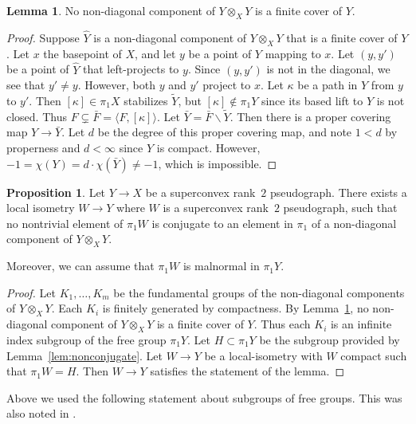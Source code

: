 \documentclass[12pt,oneside]{amsart}
\theoremstyle{definition}
\newtheorem{lem}[thm]{Lemma}
\newtheorem{prop}[thm]{Proposition}
\theoremstyle{definition}
\theoremstyle{remark}
\newcommand{\euler}{\chi}
\begin{document}
\begin{lem}\label{no cover}
    No  non-diagonal component of $Y\otimes_X Y$ is a finite cover of $Y$.
\end{lem}
\begin{proof}
Suppose $\widehat Y$ is a non-diagonal component of $Y\otimes_X Y$
that is a finite cover of $Y$.
Let  $x$ the basepoint of $X$, and let $y$ be a point of $Y$ mapping to $x$.
Let $(y,y')$ be a point of $\widehat Y$ that left-projects to $y$.
Since $(y,y')$ is not in the diagonal, we see that $y'\neq y$.
However, both $y$ and $y'$ project to $x$.
Let $\kappa$ be a path in $Y$ from $y$ to $y'$.
Then $[\kappa]\in \pi_1X$ stabilizes $\widetilde Y$,
but $[\kappa]\notin \pi_1Y$ since its based lift to $Y$ is not closed.
Thus $F\subsetneq \bar F= \langle F, [\kappa]\rangle$.
Let $\bar Y=\bar F \backslash \widetilde Y$.
Then there is a proper covering map $Y\rightarrow \bar Y$.
Let $d$ be the degree of this proper covering map, and note $1<d$ by properness
and $d<\infty$ since $Y$ is compact.
However, $-1 = \euler(Y)= d\cdot\euler(\bar Y) \neq -1$, which is impossible.
\end{proof}


\begin{prop}\label{prop: no conj}
    Let $Y\to X$ be a superconvex rank~$2$ pseudograph.
    There exists a local isometry $W\to Y$ where $W$ is a superconvex rank~$2$ pseudograph, such that no nontrivial element of $\pi_1W$ is conjugate to an element in $\pi_1$ of a non-diagonal component of $Y\otimes_X Y$. 
    
    Moreover, we can assume that $\pi_1W$ is malnormal in $\pi_1 Y$.
\end{prop}
\begin{proof}
Let $K_1,\ldots, K_m$ be the fundamental groups of the non-diagonal components of $Y \otimes_X Y$.
Each $K_i$ is finitely generated by compactness.
By Lemma~\ref{no cover}, no non-diagonal component of $Y \otimes_X Y$ is a finite cover of $Y$.
Thus each $K_i$ is an infinite index subgroup of the free group $\pi_1 Y$. Let $H\subset \pi_1 Y$ be the 
subgroup provided %
by Lemma~\ref{lem:nonconjugate}.
Let $W\rightarrow Y$ be a local-isometry with $W$ compact such that $\pi_1W=H$. Then $W\rightarrow Y$ satisfies the statement of the lemma.
\end{proof}

Above we used the following statement about %
subgroups of free groups. This was also noted in \cite[Thm~D]{Kapovich99}.
\end{document}
